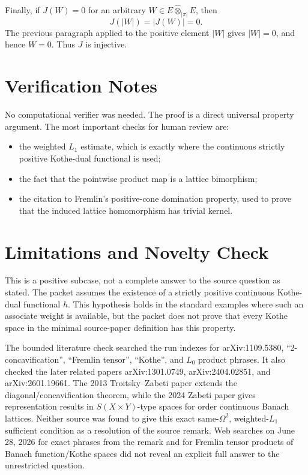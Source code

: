 \documentclass[11pt]{article}
\newcommand{\abs}[1]{\left\lvert #1 \right\rvert}
\newcommand{\FremlinTensor}{\widehat{\otimes}_{|\pi|}}
\begin{document}
Finally, if \(J(W)=0\) for an arbitrary \(W\in E\FremlinTensor E\), then
\[
  J(\abs{W})=\abs{J(W)}=0.
\]
The previous paragraph applied to the positive element \(\abs{W}\) gives
\(\abs{W}=0\), and hence \(W=0\). Thus \(J\) is injective.

\section*{Verification Notes}

No computational verifier was needed. The proof is a direct universal
property argument. The most important checks for human review are:

\begin{itemize}
\item the weighted \(L_1\) estimate, which is exactly where the continuous
strictly positive Kothe-dual functional is used;
\item the fact that the pointwise product map is a lattice bimorphism;
\item the citation to Fremlin's positive-cone domination property, used to
prove that the induced lattice homomorphism has trivial kernel.
\end{itemize}

\section*{Limitations and Novelty Check}

This is a positive subcase, not a complete answer to the source question as
stated. The packet assumes the existence of a strictly positive continuous
Kothe-dual functional \(h\). This hypothesis holds in the standard examples
where such an associate weight is available, but the packet does not prove
that every Kothe space in the minimal source-paper definition has this
property.

The bounded literature check searched the run indexes for arXiv:1109.5380,
``2-concavification'', ``Fremlin tensor'', ``Kothe'', and \(L_0\) product
phrases. It also checked the later related papers arXiv:1301.0749,
arXiv:2404.02851, and arXiv:2601.19661. The 2013 Troitsky--Zabeti paper
extends the diagonal/concavification theorem, while the 2024 Zabeti paper
gives representation results in \(S(X\times Y)\)-type spaces for order
continuous Banach lattices. Neither source was found to give this exact
same-\(\Omega^2\), weighted-\(L_1\) sufficient condition as a resolution of
the source remark. Web searches on June 28, 2026 for exact phrases from the
remark and for Fremlin tensor products of Banach function/Kothe spaces did
not reveal an explicit full answer to the unrestricted question.
\end{document}
